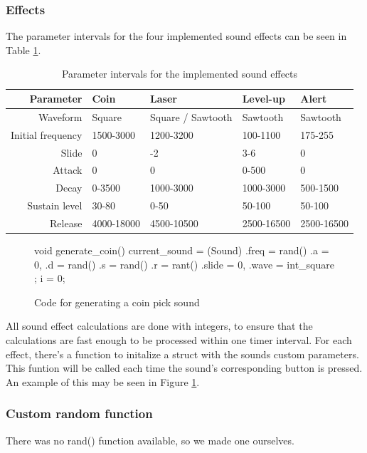 \subsubsection{Effects}

The parameter intervals for the four implemented sound effects can be seen in Table \ref{tab:sound_effects}.

\begin{table}[ht!]
    \begin{center}
    \begin{tabular}{r|llll}
    Parameter         & Coin       & Laser             & Level-up   & Alert      \\
    \hline
    Waveform          & Square     & Square / Sawtooth & Sawtooth   & Sawtooth   \\
    Initial frequency & 1500-3000  & 1200-3200         & 100-1100   & 175-255    \\
    Slide             & 0          & -2                & 3-6        & 0          \\
    Attack            & 0          & 0                 & 0-500      & 0          \\
    Decay             & 0-3500     & 1000-3000         & 1000-3000  & 500-1500   \\
    Sustain level     & 30-80      & 0-50              & 50-100     & 50-100     \\
    Release           & 4000-18000 & 4500-10500        & 2500-16500 & 2500-16500 \\
    \end{tabular}
    \end{center}
    \caption{Parameter intervals for the implemented sound effects}
    \label{tab:sound_effects}
\end{table}


\begin{figure}[ht!]
\begin{code}
void generate_coin() {
    current_sound = (Sound){
        .freq = rand() %
        .a = 0,
        .d = rand() %
        .s = rand() %
        .r = rant() %
        .slide = 0,
        .wave = int_square
    };
    i = 0;
}
\end{code}
\caption{Code for generating a coin pick sound}
\label{fig:coin}
\end{figure}

All sound effect calculations are done with integers, to ensure that the calculations are fast enough to be processed within one timer interval.
For each effect, there's a function to initalize a struct with the sounds custom parameters. This funtion will be called each time the sound's corresponding button is pressed. An example of this may be seen in Figure \ref{fig:coin}.

\subsubsection{Custom random function}

There was no rand() function available, so we made one ourselves.
